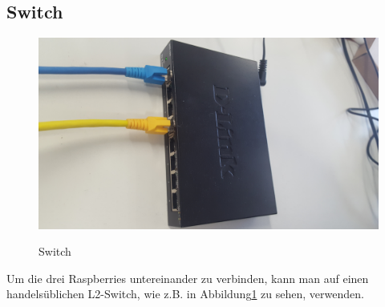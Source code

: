 \subsection{Switch}
    	\begin{figure}[H]
		\centering
		\includegraphics[width=1.0\textwidth]{images/raspberry_aufbau/Switch.jpg}
        \label{fig:switch}
		\caption{Switch}
	\end{figure}
Um die drei Raspberries untereinander zu verbinden, kann man auf einen handelsüblichen L2-Switch, wie z.B. in Abbildung\ref{fig:switch} zu sehen, verwenden.

